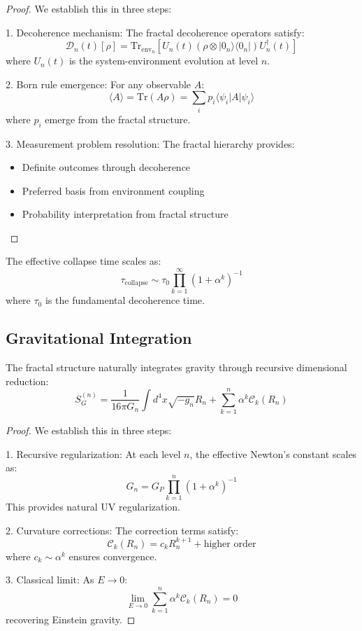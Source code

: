 \documentclass{article}
\begin{document}
\begin{proof}
We establish this in three steps:

1. Decoherence mechanism:
   The fractal decoherence operators satisfy:
   \[
   \mathcal{D}_n(t)[\rho] = \text{Tr}_{\text{env}_n}\left[U_n(t)(\rho \otimes |0_n\rangle\langle 0_n|)U_n^\dagger(t)\right]
   \]
   where $U_n(t)$ is the system-environment evolution at level $n$.

2. Born rule emergence:
   For any observable $A$:
   \[
   \langle A \rangle = \text{Tr}(A\rho) = \sum_i p_i \langle \psi_i|A|\psi_i\rangle
   \]
   where $p_i$ emerge from the fractal structure.

3. Measurement problem resolution:
   The fractal hierarchy provides:
   \begin{itemize}
   \item Definite outcomes through decoherence
   \item Preferred basis from environment coupling
   \item Probability interpretation from fractal structure
   \end{itemize}
\end{proof}

\begin{corollary}
The effective collapse time scales as:
\[
\tau_{\text{collapse}} \sim \tau_0 \prod_{k=1}^{\infty} (1 + \alpha^k)^{-1}
\]
where $\tau_0$ is the fundamental decoherence time.
\end{corollary}

\subsection{Gravitational Integration}

\begin{theorem}
The fractal structure naturally integrates gravity through recursive dimensional reduction:
\[
S_G^{(n)} = \frac{1}{16\pi G_n} \int d^4x \sqrt{-g_n} R_n + \sum_{k=1}^n \alpha^k \mathcal{C}_k(R_n)
\]
\end{theorem}

\begin{proof}
We establish this in three steps:

1. Recursive regularization:
   At each level $n$, the effective Newton's constant scales as:
   \[
   G_n = G_P \prod_{k=1}^n (1 + \alpha^k)^{-1}
   \]
   This provides natural UV regularization.

2. Curvature corrections:
   The correction terms satisfy:
   \[
   \mathcal{C}_k(R_n) = c_k R_n^{k+1} + \text{higher order}
   \]
   where $c_k \sim \alpha^k$ ensures convergence.

3. Classical limit:
   As $E \to 0$:
   \[
   \lim_{E \to 0} \sum_{k=1}^n \alpha^k \mathcal{C}_k(R_n) = 0
   \]
   recovering Einstein gravity.
\end{proof}
\end{document}
